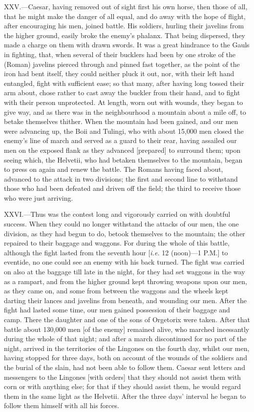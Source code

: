 XXV.—Caesar, having removed out of sight first his own horse, then
those of all, that he might make the danger of all equal, and do away
with the hope of flight, after encouraging his men, joined battle. His
soldiers, hurling their javelins from the higher ground, easily broke
the enemy's phalanx. That being dispersed, they made a charge on them
with drawn swords. It was a great hindrance to the Gauls in fighting,
that, when several of their bucklers had been by one stroke of the
(Roman) javelins pierced through and pinned fast together, as the point
of the iron had bent itself, they could neither pluck it out, nor, with
their left hand entangled, fight with sufficient ease; so that many,
after having long tossed their arm about, chose rather to cast away the
buckler from their hand, and to fight with their person unprotected. At
length, worn out with wounds, they began to give way, and as there was
in the neighbourhood a mountain about a mile off, to betake themselves
thither. When the mountain had been gained, and our men were advancing
up, the Boii and Tulingi, who with about 15,000 men closed the enemy's
line of march and served as a guard to their rear, having assailed our
men on the exposed flank as they advanced [prepared] to surround them;
upon seeing which, the Helvetii, who had betaken themselves to the
mountain, began to press on again and renew the battle. The Romans
having faced about, advanced to the attack in two divisions; the first
and second line to withstand those who had been defeated and driven off
the field; the third to receive those who were just arriving.

XXVI.—Thus was the contest long and vigorously carried on with doubtful
success. When they could no longer withstand the attacks of our men, the
one division, as they had begun to do, betook themselves to the
mountain; the other repaired to their baggage and waggons. For during
the whole of this battle, although the fight lasted from the seventh
hour [\emph{i.e.} 12 (noon)—1 P.M.] to eventide, no one could see an enemy
with his back turned. The fight was carried on also at the baggage till
late in the night, for they had set waggons in the way as a rampart, and
from the higher ground kept throwing weapons upon our men, as they came
on, and some from between the waggons and the wheels kept darting their
lances and javelins from beneath, and wounding our men. After the fight
had lasted some time, our men gained possession of their baggage and
camp. There the daughter and one of the sons of Orgetorix were taken.
After that battle about 130,000 men [of the enemy] remained alive, who
marched incessantly during the whole of that night; and after a march
discontinued for no part of the night, arrived in the territories of the
Lingones on the fourth day, whilst our men, having stopped for three
days, both on account of the wounds of the soldiers and the burial of
the slain, had not been able to follow them. Caesar sent letters and
messengers to the Lingones [with orders] that they should not assist
them with corn or with anything else; for that if they should assist
them, he would regard them in the same light as the Helvetii. After the
three days' interval he began to follow them himself with all his
forces.

